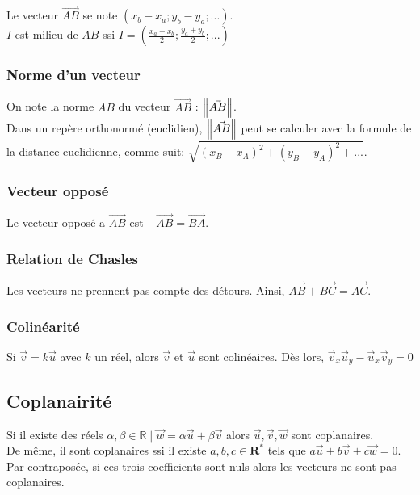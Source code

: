 \documentclass{article}
\begin{document}
Le vecteur $\Vec{AB}$ se note $(x_b - x_a ; y_b - y_a ; ...)$.\\
$I$ est milieu de $AB$ ssi $I=(\frac{x_a+x_b}{2};\frac{y_a+y_b}{2};...)$



\subsubsection{Norme d'un vecteur}
On note la norme $AB$ du vecteur $\Vec{AB}$ : $\norm{\Vec{AB}}$.\\
Dans un repère orthonormé (euclidien), $\norm{\Vec{AB}}$ peut se calculer avec la formule de la distance euclidienne, comme suit: $\sqrt{(x_B-x_A)^2+ (y_B-y_A)^2+...}$.

\subsubsection{Vecteur opposé}
Le vecteur opposé a $\Vec{AB}$ est $-\Vec{AB} = \Vec{BA}$.

\subsubsection{Relation de Chasles}
Les vecteurs ne prennent pas compte des détours. Ainsi, $\Vec{AB}+\Vec{BC}=\Vec{AC}$.

\subsubsection{Colinéarité}
Si $\Vec{v} = k\Vec{u}$ avec $k$ un réel, alors $\Vec{v}$ et $\Vec{u}$ sont colinéaires. Dès lors, $\Vec{v}_x\Vec{u}_y - \Vec{u}_x\Vec{v}_y = 0$

\subsection{Coplanairité}
Si il existe des réels $\alpha,\beta\in\mathbb{R}\mid\Vec{w}=\alpha\Vec{u}+\beta\Vec{v}$ alors $\Vec{u},\Vec{v},\Vec{w}$ sont coplanaires.\\
De même, il sont coplanaires ssi il existe $a,b,c\in\mathbf{R^*}$ tels que $a\Vec{u}+b\Vec{v}+c\Vec{w}=0$. Par contraposée, si ces trois coefficients sont nuls alors les vecteurs ne sont pas coplanaires.
\end{document}
